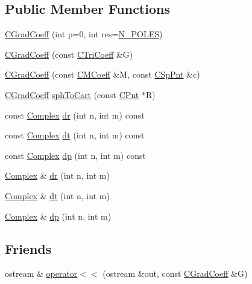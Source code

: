 \subsection*{Public Member Functions}
\begin{DoxyCompactItemize}
\item 
\hyperlink{classCGradCoeff_a7c595720bc6386dbe58e7a02a145ed74}{C\-Grad\-Coeff} (int p=0, int res=\hyperlink{mcoeff_8h_ac23f9c13c5d07d9ce386f7a830c35e5a}{N\-\_\-\-P\-O\-L\-E\-S})
\item 
\hyperlink{classCGradCoeff_a08b900b0d57467172733978a44c076f8}{C\-Grad\-Coeff} (const \hyperlink{classCTriCoeff}{C\-Tri\-Coeff} \&G)
\item 
\hyperlink{classCGradCoeff_a41d80b3998f3dfe2a9111ab9f00855fb}{C\-Grad\-Coeff} (const \hyperlink{classCMCoeff}{C\-M\-Coeff} \&M, const \hyperlink{classCSpPnt}{C\-Sp\-Pnt} \&c)
\item 
\hyperlink{classCGradCoeff}{C\-Grad\-Coeff} \hyperlink{classCGradCoeff_ae5711114b36c80f3547ec0857e476500}{sph\-To\-Cart} (const \hyperlink{classCPnt}{C\-Pnt} $\ast$R)
\item 
const \hyperlink{util_8h_a0ef19d29521fc1e3356ea268ba175cfc}{Complex} \hyperlink{classCGradCoeff_ada19e3bbd4f70e5115535cc4365f51b3}{dr} (int n, int m) const 
\item 
const \hyperlink{util_8h_a0ef19d29521fc1e3356ea268ba175cfc}{Complex} \hyperlink{classCGradCoeff_ace80d29d482ccc81d023c2a035dd6022}{dt} (int n, int m) const 
\item 
const \hyperlink{util_8h_a0ef19d29521fc1e3356ea268ba175cfc}{Complex} \hyperlink{classCGradCoeff_a85b5a919cd317987dcb62c7828d179f5}{dp} (int n, int m) const 
\item 
\hyperlink{util_8h_a0ef19d29521fc1e3356ea268ba175cfc}{Complex} \& \hyperlink{classCGradCoeff_acb9edf25321b20753b1e44f1f1a34a04}{dr} (int n, int m)
\item 
\hyperlink{util_8h_a0ef19d29521fc1e3356ea268ba175cfc}{Complex} \& \hyperlink{classCGradCoeff_a7f6f243c58b4de0be441447b4cc1e7e7}{dt} (int n, int m)
\item 
\hyperlink{util_8h_a0ef19d29521fc1e3356ea268ba175cfc}{Complex} \& \hyperlink{classCGradCoeff_afb5b5790c9ddcfbc2b3f88227ca3b74f}{dp} (int n, int m)
\end{DoxyCompactItemize}
\subsection*{Friends}
\begin{DoxyCompactItemize}
\item 
ostream \& \hyperlink{classCGradCoeff_a81f3ceab707183d2313bf86d44b71476}{operator$<$$<$} (ostream \&out, const \hyperlink{classCGradCoeff}{C\-Grad\-Coeff} \&G)
\end{DoxyCompactItemize}
